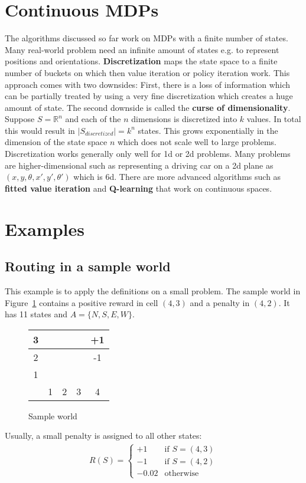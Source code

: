 \documentclass{report}
\begin{document}
\section{Continuous MDPs}
The algorithms discussed so far work on MDPs with a finite number of states. Many real-world problem need an infinite amount of states e.g. to represent positions and orientations. {\bf Discretization} maps the state space to a finite number of buckets on which then value iteration or policy iteration work.
This approach comes with two downsides: First, there is a loss of information which can be partially treated by using a very fine discretization which creates a huge amount of state.
The second downside is called the {\bf curse of dimensionality}. Suppose $S=\mathbb{R}^n$ and each of the $n$ dimensions is discretized into $k$ values. In total this would result in $\vert S_{discretized}\vert=k^n$ states.
This grows exponentially in the dimension of the state space $n$ which does not scale well to large problems. Discretization works generally only well for 1d or 2d problems. Many problems are higher-dimensional such as representing a driving car on a 2d plane as $(x, y, \theta, x', y', \theta')$ which is 6d. There are more advanced algorithms such as {\bf fitted value iteration} and {\bf Q-learning} that work on continuous spaces.

\section{Examples}
\subsection{Routing in a sample world}
This example is to apply the definitions on a small problem. The sample world in Figure~\ref{ref:sampleworld} contains a positive reward in cell $(4, 3)$ and a penalty in $(4, 2)$. It has 11 states and $A = \{N, S, E, W\}$.
\begin{figure}[h!]
\centering
\begin{tabular}{c|c|c|c|c|}
\hline
3 & & & & +1 \\
\hline
2 & & \cellcolor{black} & & -1 \\
\hline
1 & & & & \\
\hline
& 1 & 2 & 3 & 4 \\
\end{tabular}
\caption{Sample world}
\label{ref:sampleworld}
\end{figure}

Usually, a small penalty is assigned to all other states:
\begin{align*}
R(S)=
\left\{
\begin{array}{ll}
+1 & \mbox{if } S = (4,3) \\
-1  & \mbox{if } S = (4,2) \\
-0.02 & \mbox{otherwise}
\end{array}
\right.
\end{align*}
\end{document}

